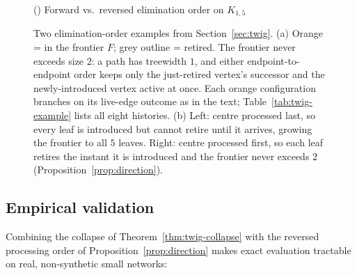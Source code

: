 \documentclass[ASNA,number]{USG}
\newcounter{subfigcnt}[figure]
\begin{document}
\begin{figure}[h]
\begin{minipage}[t]{0.5\textwidth}
{}
\par\smallskip\centering\footnotesize{}() Forward vs.\ reversed elimination order on $K_{1,5}$\par
\label{fig:star-direction}
\end{minipage}

\addtocounter{figure}{-1}\caption{Two elimination-order examples from Section~\ref{sec:twig}. (a) Orange = in the frontier $F$; grey outline = retired. The frontier
never exceeds size $2$: a path has treewidth $1$, and either
endpoint-to-endpoint order keeps only the just-retired vertex's successor
and the newly-introduced vertex active at once. Each orange configuration
branches on its live-edge outcome as in the text; Table~\ref{tab:twig-example}
lists all eight histories. (b) Left: centre processed last, so every leaf
is introduced but cannot retire until it arrives, growing the frontier to
all $5$ leaves. Right: centre processed first, so each leaf retires the
instant it is introduced and the frontier never exceeds $2$
(Proposition~\ref{prop:direction}).}
\end{figure}

\subsection{Empirical validation}\label{sec:twig-empirical}

Combining the collapse of Theorem~\ref{thm:twig-collapse} with the reversed
processing order of Proposition~\ref{prop:direction} makes exact evaluation
tractable on real, non-synthetic small networks:
\end{document}
